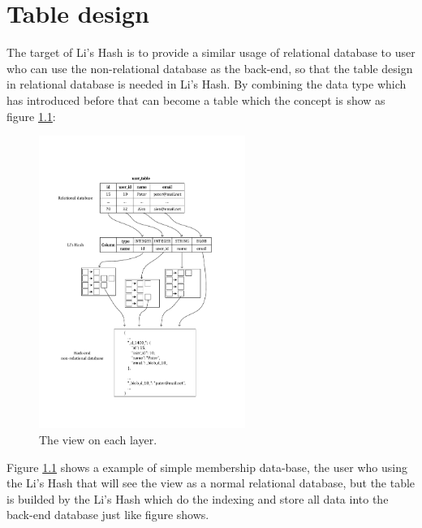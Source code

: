\chapter{Table design}
\label{chapter:table_design}

\baselineskip=26pt
\thispagestyle{empty}

The target of Li's Hash is to provide a similar usage of relational database to user who can use the non-relational database as the back-end, so that the table design in relational database is needed in Li's Hash. By combining the data type which has introduced before that can become a table which the concept is show as figure \ref{fig:table_design:example}:

\begin{figure}[h]
\centering
\includegraphics[width=0.6\textwidth]{./table-design/pic/design_example_v2.pdf}
\caption{The view on each layer.}
\label{fig:table_design:example}
\end{figure}

Figure \ref{fig:table_design:example} shows a example of simple membership data-base, the user who using the Li's Hash that will see the view as a normal relational database, but the table is builded by the Li's Hash which do the indexing and store all data into the back-end database just like figure shows.\\

